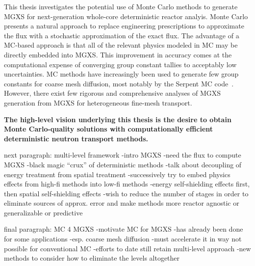 
This thesis investigates the potential use of Monte Carlo methods to generate \ac{MGXS} for next-generation whole-core deterministic reactor analyis. Monte Carlo presents a natural approach to replace engineering prescriptions to approximate the flux with a stochastic approximation of the exact flux. The advantage of a \ac{MC}-based approach is that all of the relevant physics modeled in \ac{MC} may be directly embedded into \ac{MGXS}. This improvement in accuracy comes at the computational expense of converging group constant tallies to acceptably low uncertainties. \ac{MC} methods have increasingly been used to generate few group constants for coarse mesh diffusion, most notably by the Serpent \ac{MC} code~\cite{serpent2013manual}. However, there exist few rigorous and comprehensive analyses of \ac{MGXS} generation from \ac{MGXS} for heterogeneous fine-mesh transport.

\begin{emphbox}
\textbf{The high-level vision underlying this thesis is the desire to obtain Monte Carlo-quality solutions with computationally efficient deterministic neutron transport methods.}
\end{emphbox}

next paragraph: multi-level framework
-intro MGXS
-need the flux to compute MGXS
-black magic ``crux'' of deterministic methods
-talk about decoupling of energy treatment from spatial treatment
  -successively try to embed physics effects from high-fi methods into low-fi methods
  -energy self-shielding effects first, then spatial self-shielding effects
-wish to reduce the number of stages in order to eliminate sources of approx. error and make methods more reactor agnostic or generalizable or predictive

final paragraph: MC 4 MGXS
-motivate \ac{MC} for \ac{MGXS}
-has already been done for some applications
  -esp. coarse mesh diffusion
-must accelerate it in way not possible for conventional \ac{MC}
-efforts to date still retain multi-level approach
  -new methods to consider how to eliminate the levels altogether

